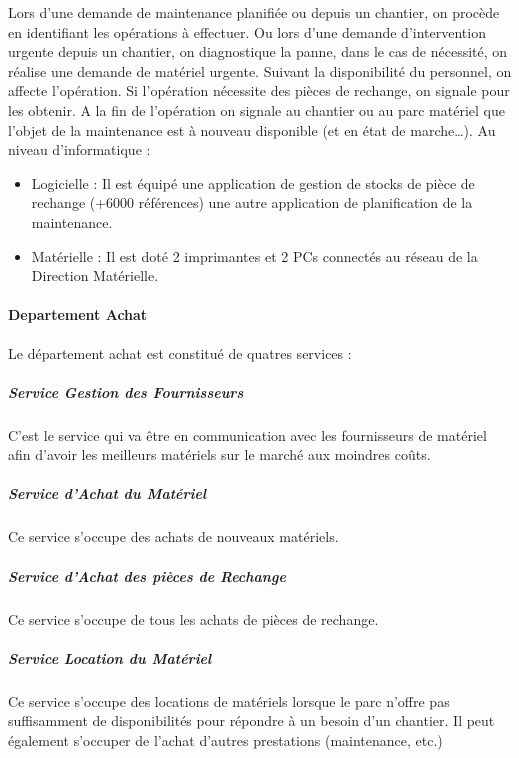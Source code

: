 Lors d’une demande de maintenance planifiée ou  depuis un chantier, on procède en identifiant les opérations à effectuer. Ou lors d’une demande d’intervention urgente depuis un chantier, on diagnostique la panne, dans le cas de nécessité, on réalise une demande de matériel urgente.
Suivant la disponibilité du personnel, on affecte l’opération. Si l’opération nécessite des pièces de rechange, on signale pour les obtenir.
A la fin de l’opération on signale au chantier ou au parc matériel que l’objet de la maintenance est à nouveau disponible (et en état de marche…).
Au niveau d’informatique : 
\begin{itemize}
	\item Logicielle : Il est équipé une application de gestion de stocks de pièce de rechange (+6000 références) une autre application de planification de la maintenance.
\item Matérielle : Il est doté 2 imprimantes et 2 PCs connectés au réseau de la Direction Matérielle.
\end{itemize}

            \paragraph{Departement Achat}
                Le département achat est constitué de quatres services :

                \subparagraph{Service Gestion des Fournisseurs}
	                C'est le service qui va être en communication avec les fournisseurs de matériel afin d'avoir les meilleurs matériels sur le marché aux moindres coûts.
                \subparagraph{Service d’Achat du Matériel}
	                Ce service s'occupe des achats de nouveaux matériels.
                \subparagraph{Service d’Achat des pièces de Rechange}
	                Ce service s'occupe de tous les achats de pièces de rechange.
                \subparagraph{Service Location du Matériel}
	                Ce service s'occupe des locations de matériels lorsque le parc n'offre pas suffisamment de disponibilités pour répondre à un besoin d'un chantier. Il peut également s’occuper de l’achat d’autres prestations (maintenance, etc.)

